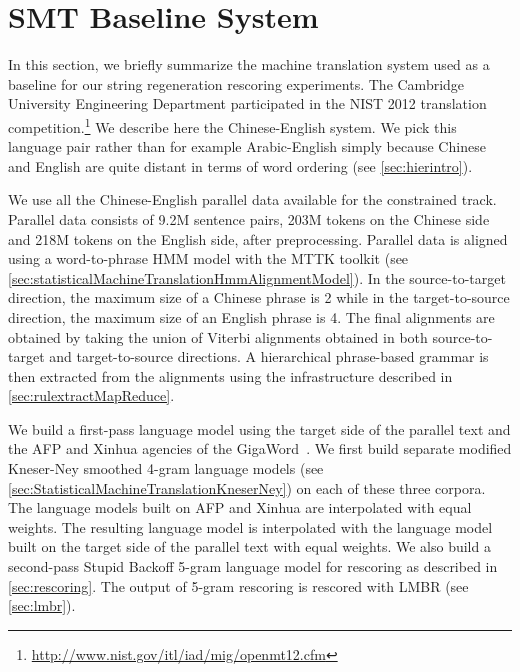 \section{SMT Baseline System}
\label{sec:gyroTransExpSetting}

In this section, we briefly summarize the machine translation
system used as a baseline for our string regeneration rescoring
experiments.
%
%
The Cambridge University Engineering Department participated in the
NIST 2012 translation
competition.\footnote{\url{http://www.nist.gov/itl/iad/mig/openmt12.cfm}}
We describe here the Chinese-English system. We pick this language
pair rather than for example Arabic-English simply because Chinese
and English are quite distant in terms of word ordering (see \autoref{sec:hierintro}).

We use all the Chinese-English parallel data
available for the constrained track. Parallel data consists
of 9.2M sentence pairs, 203M tokens on the Chinese side and
218M tokens on the English side, after preprocessing.
Parallel data is aligned using a word-to-phrase
HMM model with the MTTK
toolkit (see \autoref{sec:statisticalMachineTranslationHmmAlignmentModel}).
In the source-to-target direction, the maximum size of a Chinese phrase is 2 while
in the target-to-source direction, the maximum size of an English phrase is 4. %
The final alignments are obtained by taking
the union of Viterbi alignments obtained
in both source-to-target and target-to-source directions.
A hierarchical phrase-based grammar is then extracted from
the alignments using the infrastructure described
in \autoref{sec:rulextractMapReduce}.

We build a first-pass language model using the target side
of the parallel text and the AFP and Xinhua agencies of the
GigaWord~\citep{parker-graff-kong-chen-maeda:2009:LDC}. %
We first build separate modified Kneser-Ney smoothed 4-gram language
models (see \autoref{sec:StatisticalMachineTranslationKneserNey})
on each of these three corpora. The language models built on AFP
and Xinhua are interpolated with equal weights. The
resulting language model is interpolated with the
language model built on the target side of the parallel
text with equal weights. We also build a second-pass %
Stupid Backoff 5-gram language model for rescoring
as described in \autoref{sec:rescoring}.
The output of 5-gram rescoring is rescored with LMBR (see \autoref{sec:lmbr}).

